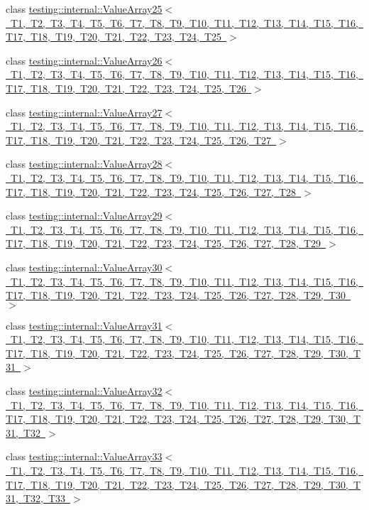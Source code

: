 \begin{DoxyCompactItemize}
\item 
class \mbox{\hyperlink{classtesting_1_1internal_1_1_value_array25}{testing\+::internal\+::\+Value\+Array25$<$ T1, T2, T3, T4, T5, T6, T7, T8, T9, T10, T11, T12, T13, T14, T15, T16, T17, T18, T19, T20, T21, T22, T23, T24, T25 $>$}}
\item 
class \mbox{\hyperlink{classtesting_1_1internal_1_1_value_array26}{testing\+::internal\+::\+Value\+Array26$<$ T1, T2, T3, T4, T5, T6, T7, T8, T9, T10, T11, T12, T13, T14, T15, T16, T17, T18, T19, T20, T21, T22, T23, T24, T25, T26 $>$}}
\item 
class \mbox{\hyperlink{classtesting_1_1internal_1_1_value_array27}{testing\+::internal\+::\+Value\+Array27$<$ T1, T2, T3, T4, T5, T6, T7, T8, T9, T10, T11, T12, T13, T14, T15, T16, T17, T18, T19, T20, T21, T22, T23, T24, T25, T26, T27 $>$}}
\item 
class \mbox{\hyperlink{classtesting_1_1internal_1_1_value_array28}{testing\+::internal\+::\+Value\+Array28$<$ T1, T2, T3, T4, T5, T6, T7, T8, T9, T10, T11, T12, T13, T14, T15, T16, T17, T18, T19, T20, T21, T22, T23, T24, T25, T26, T27, T28 $>$}}
\item 
class \mbox{\hyperlink{classtesting_1_1internal_1_1_value_array29}{testing\+::internal\+::\+Value\+Array29$<$ T1, T2, T3, T4, T5, T6, T7, T8, T9, T10, T11, T12, T13, T14, T15, T16, T17, T18, T19, T20, T21, T22, T23, T24, T25, T26, T27, T28, T29 $>$}}
\item 
class \mbox{\hyperlink{classtesting_1_1internal_1_1_value_array30}{testing\+::internal\+::\+Value\+Array30$<$ T1, T2, T3, T4, T5, T6, T7, T8, T9, T10, T11, T12, T13, T14, T15, T16, T17, T18, T19, T20, T21, T22, T23, T24, T25, T26, T27, T28, T29, T30 $>$}}
\item 
class \mbox{\hyperlink{classtesting_1_1internal_1_1_value_array31}{testing\+::internal\+::\+Value\+Array31$<$ T1, T2, T3, T4, T5, T6, T7, T8, T9, T10, T11, T12, T13, T14, T15, T16, T17, T18, T19, T20, T21, T22, T23, T24, T25, T26, T27, T28, T29, T30, T31 $>$}}
\item 
class \mbox{\hyperlink{classtesting_1_1internal_1_1_value_array32}{testing\+::internal\+::\+Value\+Array32$<$ T1, T2, T3, T4, T5, T6, T7, T8, T9, T10, T11, T12, T13, T14, T15, T16, T17, T18, T19, T20, T21, T22, T23, T24, T25, T26, T27, T28, T29, T30, T31, T32 $>$}}
\item 
class \mbox{\hyperlink{classtesting_1_1internal_1_1_value_array33}{testing\+::internal\+::\+Value\+Array33$<$ T1, T2, T3, T4, T5, T6, T7, T8, T9, T10, T11, T12, T13, T14, T15, T16, T17, T18, T19, T20, T21, T22, T23, T24, T25, T26, T27, T28, T29, T30, T31, T32, T33 $>$}}

\end{DoxyCompactItemize}

